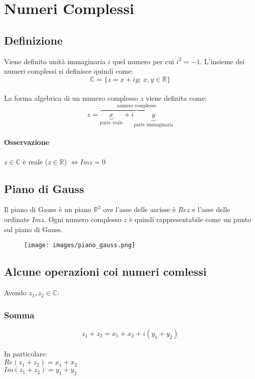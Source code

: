 \chapter{Numeri Complessi}
\section{Definizione}
Viene definito unità immaginaria $i$ quel numero per cui $i^2 = -1$.
L'insieme dei numeri complessi si definisce quindi come:\\
\begin{equation}
\mathbb{C} = \{z = x + iy;\ x,y \in \mathbb{R}\}
\end{equation}\\
La forma algebrica di un numero complesso $z$ viene definita come:
\[
z = \overbrace{
	\underbrace{x}_\text{parte reale} + i
	\underbrace{y}_\text{parte immaginaria}
}^\text{numero complesso}
\]
\subsubsection{Osservazione}
$z \in \mathbb{C}$ è reale ($z \in \mathbb{R}$) $\iff Imz = 0$

\section{Piano di Gauss}
Il piano di Gauss è un piano $\mathbb{R}^2$ ove l'asse delle ascisse è $Rez$ e l'asse delle ordinate $Imz$. Ogni numero complesso $z$ è quindi rappresentabile come un punto sul piano di Gauss.\\
\begin{figure}[htbp]
	\centering
	\texttt{[image: images/piano\_gauss.png]}
\end{figure}

\section{Alcune operazioni coi numeri comlessi}
Avendo $z_1,z_2 \in \mathbb{C}$:

\subsection{Somma}
\begin{equation}
z_1+z_2 = x_1+x_2+i(y_1+y_2)
\end{equation}\\
In particolare:\\
$Re(z_1+z_2) = x_1+x_2$\\
$Im(z_1+z_2) = y_1+y_2$
